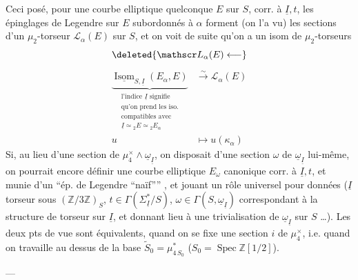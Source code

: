 Ceci posé, pour une courbe elliptique quelconque $E$ sur $S$, corr. à $\underline I,t$, les épinglages de Legendre sur $E$ subordonnés à $\alpha$ forment (on l'a vu) les sections d'un $\mu_2$-torseur $\mathscr L_\alpha(E)$ sur $S$, et on voit de suite qu'on a un isom de $\mu_2$-torseurs
\[
\deleted{\mathscr L_\alpha(E)\longleftarrow}
\]
\[
\begin{aligned}
\underbrace{\underline{\operatorname{Isom}}_{S,\underline I}(E_\alpha,E)}_{
\substack{\text{l'indice }\underline I\text{ signifie}\\
\text{qu'on prend les iso.}\\
\text{compatibles avec}\\
\underline I\simeq {}_2E\simeq {}_2E_\alpha}}
&\xrightarrow{\sim}\mathscr L_\alpha(E)\\
u&\longmapsto u(\kappa_\alpha)
\end{aligned}\tag*{(57)}
\]
Si, au lieu d'une section \inserted{$\alpha$} de $\mu_4^\times\mathbin{\wedge}\underline\omega_{\underline I}$, on disposait d'une section $\omega$ de $\underline\omega_{\underline I}$ lui-même, on pourrait encore définir une courbe elliptique $E_\omega$ canonique corr. à $\underline I,t$, et munie d'un ``ép. de Legendre ``naïf'''' , et
jouant un rôle universel pour   données ($\underline I$ torseur sous $(\mathbb Z/3\mathbb Z)_S$, $t\in\Gamma(\Sigma^*_{\underline I}/S)$, $\omega\in\Gamma(S,\underline\omega_{\underline I})$ correspondant à la structure de torseur sur $\underline I$, et donnant lieu à une trivialisation de $\underline\omega_{\underline I}$ sur $S$ \ldots). Les deux pts de vue sont équivalents, quand on se fixe une section $i$ de $\mu_4^\times$, i.e. quand on travaille au dessus de la base $\widetilde S_0=\mu_{4\,S_0}^*$ ($S_0=\operatorname{Spec}\mathbb Z[1/2]$).

\begin{center}---\end{center}

